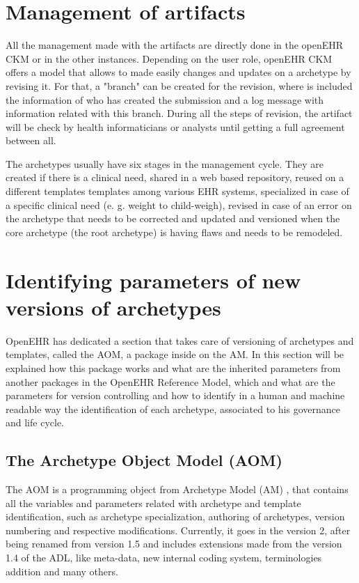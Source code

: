 \documentclass[mim_thesis.tex]{subfiles}
\begin{document}
\section{Management of artifacts}

All the management made with the artifacts are directly done in the openEHR CKM or in the other instances. Depending on the user role, openEHR CKM offers a model that allows to made easily changes and updates on a archetype by revising it. For that, a "branch" can be created for the revision, where is included the information of who has created the submission and a log message with information related with this branch. During all the steps of revision, the artifact will be check by health informaticians or analysts until getting a full agreement between all. 

The archetypes usually have six stages in the management cycle. They are created if there is a clinical need, shared in a web based repository, reused on a different templates templates among various EHR systems, specialized in case of a specific clinical need (e. g. weight to child-weigh), revised in case of an error on the archetype that needs to be corrected and updated and versioned when the core archetype (the root archetype) is having flaws and needs to be remodeled. \citep{article2006leslie}


\section{Identifying parameters of new versions of archetypes}

OpenEHR has dedicated a section that takes care of versioning of archetypes and templates, called the \ac{AOM}, a package inside on the \ac{AM}. In this section will be explained how this package works and what are the inherited parameters from another packages in the OpenEHR Reference Model, which and what are the parameters for version controlling and how to identify in a human and machine readable way the identification of each archetype, associated to his governance and life cycle. 

\subsection{The Archetype Object Model (AOM)}
The AOM is a programming object from Archetype Model (AM) \citep{openEHRAOM}, that contains all the variables and parameters related with  archetype and template identification, such as archetype specialization, authoring of archetypes, version numbering and respective modifications. Currently, it goes in the version 2, after being renamed from version 1.5 and includes extensions made from the version 1.4 of the ADL, like meta-data, new internal coding system, terminologies addition and many others. 
\end{document}
